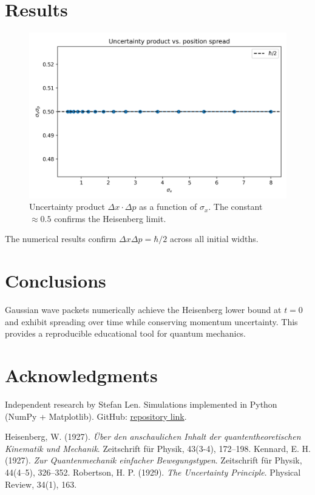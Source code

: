 \documentclass[12pt]{article}
\begin{document}
\section{Results}
\begin{figure}[h]
\centering
\includegraphics[width=0.8\linewidth]{figs/uncertainty_product.png}
\caption{Uncertainty product $\Delta x \cdot \Delta p$ as a function of $\sigma_x$. The constant $\approx 0.5$ confirms the Heisenberg limit.}
\end{figure}

The numerical results confirm $\Delta x \Delta p = \hbar / 2$ across all initial widths.

\section{Conclusions}
Gaussian wave packets numerically achieve the Heisenberg lower bound at $t=0$ and exhibit spreading over time while conserving momentum uncertainty. This provides a reproducible educational tool for quantum mechanics.

\section*{Acknowledgments}
Independent research by Stefan Len. Simulations implemented in Python (NumPy + Matplotlib).  
GitHub: \href{https://github.com/SteviLen420/Heisenberg_Uncertainty_Simulation}{repository link}.


\begin{thebibliography}{9}
 Heisenberg, W. (1927). \emph{Über den anschaulichen Inhalt der quantentheoretischen Kinematik und Mechanik}. Zeitschrift für Physik, 43(3-4), 172–198.
 Kennard, E. H. (1927). \emph{Zur Quantenmechanik einfacher Bewegungstypen}. Zeitschrift für Physik, 44(4–5), 326–352.
 Robertson, H. P. (1929). \emph{The Uncertainty Principle}. Physical Review, 34(1), 163.
\end{thebibliography}
\end{document}

